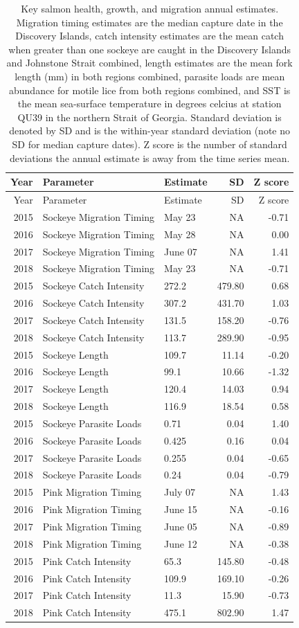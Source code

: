 \documentclass[fleqn,10pt]{wlpeerj} %
\begin{document}
\begin{longtable}[]{@{}rllrr@{}}
\caption{\label{tab:z-scores-table} Key salmon health, growth, and migration annual estimates. Migration timing estimates are the median capture date in the Discovery Islands, catch intensity estimates are the mean catch when greater than one sockeye are caught in the Discovery Islands and Johnstone Strait combined, length estimates are the mean fork length (mm) in both regions combined, parasite loads are mean abundance for motile lice from both regions combined, and SST is the mean sea-surface temperature in degrees celcius at station QU39 in the northern Strait of Georgia. Standard deviation is denoted by SD and is the within-year standard deviation (note no SD for median capture dates). Z score is the number of standard deviations the annual estimate is away from the time series mean.}\tabularnewline
\toprule
Year & Parameter & Estimate & SD & Z score\tabularnewline
\midrule
\endfirsthead
\toprule
Year & Parameter & Estimate & SD & Z score\tabularnewline
\midrule
\endhead
2015 & Sockeye Migration Timing & May 23 & NA & -0.71\tabularnewline
2016 & Sockeye Migration Timing & May 28 & NA & 0.00\tabularnewline
2017 & Sockeye Migration Timing & June 07 & NA & 1.41\tabularnewline
2018 & Sockeye Migration Timing & May 23 & NA & -0.71\tabularnewline
2015 & Sockeye Catch Intensity & 272.2 & 479.80 & 0.68\tabularnewline
2016 & Sockeye Catch Intensity & 307.2 & 431.70 & 1.03\tabularnewline
2017 & Sockeye Catch Intensity & 131.5 & 158.20 & -0.76\tabularnewline
2018 & Sockeye Catch Intensity & 113.7 & 289.90 & -0.95\tabularnewline
2015 & Sockeye Length & 109.7 & 11.14 & -0.20\tabularnewline
2016 & Sockeye Length & 99.1 & 10.66 & -1.32\tabularnewline
2017 & Sockeye Length & 120.4 & 14.03 & 0.94\tabularnewline
2018 & Sockeye Length & 116.9 & 18.54 & 0.58\tabularnewline
2015 & Sockeye Parasite Loads & 0.71 & 0.04 & 1.40\tabularnewline
2016 & Sockeye Parasite Loads & 0.425 & 0.16 & 0.04\tabularnewline
2017 & Sockeye Parasite Loads & 0.255 & 0.04 & -0.65\tabularnewline
2018 & Sockeye Parasite Loads & 0.24 & 0.04 & -0.79\tabularnewline
2015 & Pink Migration Timing & July 07 & NA & 1.43\tabularnewline
2016 & Pink Migration Timing & June 15 & NA & -0.16\tabularnewline
2017 & Pink Migration Timing & June 05 & NA & -0.89\tabularnewline
2018 & Pink Migration Timing & June 12 & NA & -0.38\tabularnewline
2015 & Pink Catch Intensity & 65.3 & 145.80 & -0.48\tabularnewline
2016 & Pink Catch Intensity & 109.9 & 169.10 & -0.26\tabularnewline
2017 & Pink Catch Intensity & 11.3 & 15.90 & -0.73\tabularnewline
2018 & Pink Catch Intensity & 475.1 & 802.90 & 1.47\tabularnewline

\end{longtable}
\end{document}
